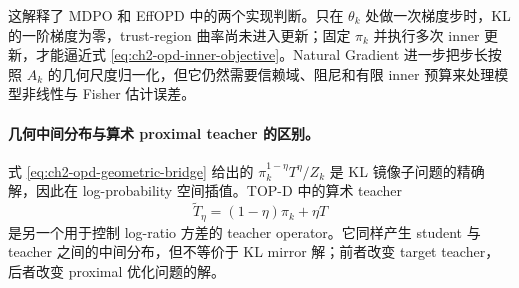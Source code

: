 这解释了 MDPO 和 EffOPD 中的两个实现判断。只在 $\theta_k$ 处做一次梯度步时，KL 的一阶梯度为零，trust-region 曲率尚未进入更新；固定 $\pi_k$ 并执行多次 inner 更新，才能逼近式 \eqref{eq:ch2-opd-inner-objective}。Natural Gradient 进一步把步长按照 $A_k$ 的几何尺度归一化，但它仍然需要信赖域、阻尼和有限 inner 预算来处理模型非线性与 Fisher 估计误差。


\paragraph*{几何中间分布与算术 proximal teacher 的区别。} 式 \eqref{eq:ch2-opd-geometric-bridge} 给出的 $\pi_k^{1-\eta}T^\eta/Z_k$ 是 KL 镜像子问题的精确解，因此在 log-probability 空间插值。TOP-D 中的算术 teacher
\[
\widetilde T_\eta=(1-\eta)\pi_k+\eta T
\]
是另一个用于控制 log-ratio 方差的 teacher operator。它同样产生 student 与 teacher 之间的中间分布，但不等价于 KL mirror 解；前者改变 target teacher，后者改变 proximal 优化问题的解。
